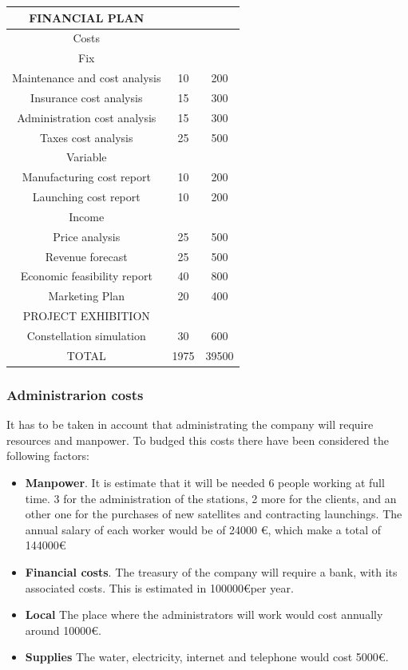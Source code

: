 \begin{longtable}{ccc}
	FINANCIAL PLAN &  &  \\ \hline
	Costs &  &  \\ \hline
	Fix &  &  \\ \hline
	Maintenance and cost analysis & 10 & 200 \\ \hline
	Insurance cost analysis & 15 & 300 \\ \hline
	Administration cost analysis & 15 & 300 \\ \hline
	Taxes cost analysis & 25 & 500 \\ \hline
	Variable &  &  \\ \hline
	Manufacturing cost report & 10 & 200 \\ \hline
	Launching cost report & 10 & 200 \\ \hline
	Income &  &  \\ \hline
	Price analysis & 25 & 500 \\ \hline
	Revenue forecast & 25 & 500 \\ \hline
	Economic feasibility report & 40 & 800 \\ \hline
	Marketing Plan & 20 & 400 \\ \hline
	\rowcolor[gray]{0.85}
	PROJECT EXHIBITION &  &  \\ \hline
	Constellation simulation & 30 & 600 \\ \hline
	\rowcolor[gray]{0.65}
	TOTAL & 1975 & 39500 \\
	\bottomrule
\end{longtable}

\subsubsection{Administrarion costs}
It has to be taken in account that administrating the company will require resources and manpower. To budged this costs there have been considered the following factors:

\begin{itemize}
\item \textbf{Manpower}. It is estimate that it will be needed 6 people working at full time. 3 for the administration of the stations, 2 more for the clients, and an other one for the purchases of new satellites and contracting launchings. The annual salary of each worker would be of 24000 \euro, which make a total of 144000\euro
\item \textbf{Financial costs}. The treasury of the company will require a  bank, with its associated costs. This is estimated in 100000\euro  per year.
\item \textbf{Local} The place where the administrators will work would cost annually around 10000\euro .
\item \textbf{Supplies} The water, electricity, internet and telephone would cost 5000\euro .
\end{itemize}

